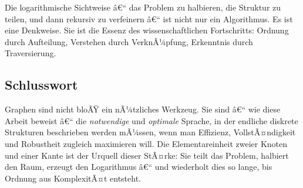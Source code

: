 ﻿\documentclass[12pt,a4paper,twoside]{article}
\theoremstyle{definition}
\theoremstyle{plain}
\theoremstyle{remark}
\begin{document}
Die logarithmische Sichtweise â€“ das Problem zu halbieren,
die Struktur zu teilen, und dann rekursiv zu verfeinern â€“
ist nicht nur ein Algorithmus.  Es ist eine Denkweise.
Sie ist die Essenz des wissenschaftlichen Fortschritts:
Ordnung durch Aufteilung, Verstehen durch VerknÃ¼pfung,
Erkenntnis durch Traversierung.

\subsection{Schlusswort}

Graphen sind nicht bloÃŸ ein nÃ¼tzliches Werkzeug.  Sie sind â€“
wie diese Arbeit beweist â€“ die \emph{notwendige} und
\emph{optimale} Sprache, in der endliche diskrete Strukturen
beschrieben werden mÃ¼ssen, wenn man Effizienz, VollstÃ¤ndigkeit
und Robustheit zugleich maximieren will.  Die Elementareinheit
zweier Knoten und einer Kante ist der Urquell dieser StÃ¤rke:
Sie teilt das Problem, halbiert den Raum, erzeugt den
Logarithmus â€“ und wiederholt dies so lange, bis Ordnung aus
KomplexitÃ¤t entsteht.
\end{document}
